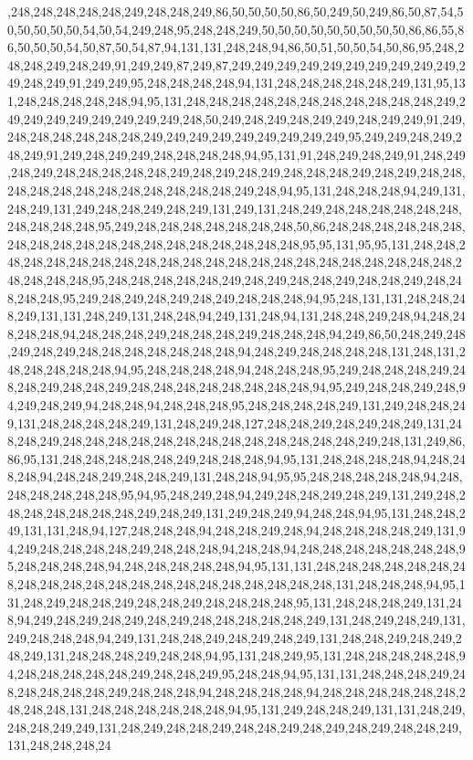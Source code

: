 ,248,248,248,248,248,249,248,248,249,86,50,50,50,50,86,50,249,50,249,86,50,87,54,50,50,50,50,50,54,50,54,249,248,95,248,248,249,50,50,50,50,50,50,50,50,50,86,86,55,86,50,50,50,54,50,87,50,54,87,94,131,131,248,248,94,86,50,51,50,50,54,50,86,95,248,248,248,249,248,249,91,249,249,87,249,87,249,249,249,249,249,249,249,249,249,249,249,248,249,91,249,249,95,248,248,248,248,94,131,248,248,248,248,248,249,131,95,131,248,248,248,248,248,94,95,131,248,248,248,248,248,248,248,248,248,248,248,249,249,249,249,249,249,249,249,249,248,50,249,248,249,248,249,249,248,249,249,91,249,248,248,248,248,248,248,249,249,249,249,249,249,249,249,249,95,249,249,248,249,248,249,91,249,248,249,249,248,248,248,248,94,95,131,91,248,249,248,249,91,248,249,248,249,248,248,248,248,248,249,248,249,248,249,248,248,248,249,248,249,248,248,248,248,248,248,248,248,248,248,248,248,249,248,94,95,131,248,248,248,94,249,131,248,249,131,249,248,248,249,248,249,131,249,131,248,249,248,248,248,248,248,248,248,248,248,248,95,249,248,248,248,248,248,248,248,50,86,248,248,248,248,248,248,248,248,248,248,248,248,248,248,248,248,248,248,248,95,95,131,95,95,131,248,248,248,248,248,248,248,248,248,248,248,248,248,248,248,248,248,248,248,248,248,248,248,248,248,248,95,248,248,248,248,248,249,248,249,248,248,249,248,248,249,248,248,248,248,95,249,248,249,248,249,248,249,248,248,248,94,95,248,131,131,248,248,248,249,131,131,248,249,131,248,248,94,249,131,248,94,131,248,248,249,248,94,248,248,248,248,94,248,248,248,249,248,248,248,249,248,248,248,94,249,86,50,248,249,248,249,248,249,248,248,248,248,248,248,248,94,248,249,248,248,248,248,131,248,131,248,248,248,248,248,94,95,248,248,248,248,94,248,248,248,95,249,248,248,248,249,248,248,249,248,248,249,248,248,248,248,248,248,248,248,94,95,249,248,248,249,248,94,249,248,249,94,248,248,94,248,248,248,95,248,248,248,248,249,131,249,248,248,249,131,248,248,248,248,249,131,248,249,248,127,248,248,249,248,249,248,249,131,248,248,249,248,248,248,248,248,248,248,248,248,248,248,248,248,249,248,131,249,86,86,95,131,248,248,248,248,248,249,248,248,248,94,95,131,248,248,248,248,94,248,248,248,94,248,248,249,248,248,249,131,248,248,94,95,95,248,248,248,248,248,94,248,248,248,248,248,248,95,94,95,248,249,248,94,249,248,248,249,248,249,131,249,248,248,248,248,248,248,248,249,248,249,131,249,248,249,94,248,248,94,95,131,248,248,249,131,131,248,94,127,248,248,248,94,248,248,249,248,94,248,248,248,248,249,131,94,249,248,248,248,248,249,248,248,248,94,248,248,94,248,248,248,248,248,248,248,95,248,248,248,248,94,248,248,248,248,248,94,95,131,131,248,248,248,248,248,248,248,248,248,248,248,248,248,248,248,248,248,248,248,248,248,131,248,248,248,94,95,131,248,249,248,248,249,248,248,249,248,248,248,248,95,131,248,248,248,249,131,248,94,249,248,249,248,249,248,249,248,248,248,248,248,249,131,248,249,248,249,131,249,248,248,248,94,249,131,248,248,249,248,249,248,249,131,248,248,249,248,249,248,249,131,248,248,248,249,248,248,94,95,131,248,249,95,131,248,248,248,248,248,94,248,248,248,248,248,249,248,248,249,95,248,248,94,95,131,131,248,248,248,249,248,248,248,248,248,249,248,248,248,94,248,248,248,248,94,248,248,248,248,248,248,248,248,248,131,248,248,248,248,248,248,94,95,131,249,248,248,249,131,131,248,249,248,248,249,249,131,248,249,248,248,249,248,248,249,248,249,248,249,248,248,249,131,248,248,248,24